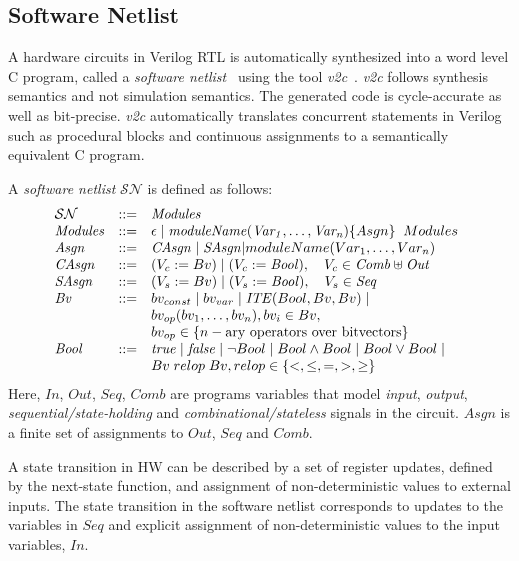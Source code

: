 \subsection{Software Netlist}
A hardware circuits in Verilog RTL is automatically synthesized 
into a word level C program, called a \textit{software 
netlist}~\cite{mtk2016,mskm2016} using the tool {\em v2c}~\cite{mtk2016}. 
{\em v2c} follows synthesis semantics and not simulation semantics.  The 
generated code is cycle-accurate as well as bit-precise. {\em v2c} 
automatically translates concurrent statements in Verilog such as 
procedural blocks and continuous assignments to a semantically 
equivalent C program. 
%
\begin{definition} 
A \textit{software netlist} $\mathcal{SN}$ is defined as follows:
%
\[ 
\begin{array}[t]{@{}lll}
\mathcal{SN} & {:}{:}{=} & \mathit{Modules} \\
\mathit{Modules} & {:}{:}{=} & \epsilon \mid \mathit{moduleName(Var_1,\dots,Var_n)} \{ Asgn \} \;\; Modules \\
\mathit{Asgn} &  {:}{:}{=} & \mathit{CAsgn} \mid \mathit{SAsgn} | moduleName(Var_1,\dots,Var_n)\\
\mathit{CAsgn} & {:}{:}{=} & (V_c := Bv) \mid (V_c := \mathit{Bool}), \quad V_c \in \mathit{Comb} \uplus \mathit{Out} \\
\mathit{SAsgn} & {:}{:}{=} & (V_s := Bv) \mid (V_s := \mathit{Bool}), \quad V_s \in \mathit{Seq} \\
\mathit{Bv} &  {:}{:}{=} & bv_{const} \mid bv_{var} \mid
	\mathit{ITE}(Bool, Bv, Bv) \mid \\
	& & bv_{op}(bv_1, \ldots, bv_n), bv_i \in Bv, \\ 
& & bv_{op} \in \{n-\text{ary operators over bitvectors} \} \\
\mathit{Bool} & {:}{:}{=} & \mathit{true} \mid \mathit{false} \mid \neg{Bool} \mid Bool \land Bool \mid 
Bool \lor Bool \mid \\ 
& & Bv\; relop\; Bv, relop \in \{<,\leq,=,>,\geq\} \\
\end{array}
\]
%
Here, $\mathit{In}$, $\mathit{Out}$, $\mathit{Seq}$, $\mathit{Comb}$
are programs variables that model \emph{input}, \emph{output}, 
\emph{sequential/state-holding} and \emph{combinational/stateless} 
signals in the circuit.  $Asgn$ is a finite set of assignments 
to $Out$, $Seq$ and $Comb$. 
\end{definition} 
%
A state transition in HW can be described by a set of register updates,
defined by the next-state function, and assignment of non-deterministic 
values to external inputs. The state transition in the software netlist 
corresponds to updates to the variables in $Seq$ and explicit assignment 
of non-deterministic values to the input variables, $In$.

